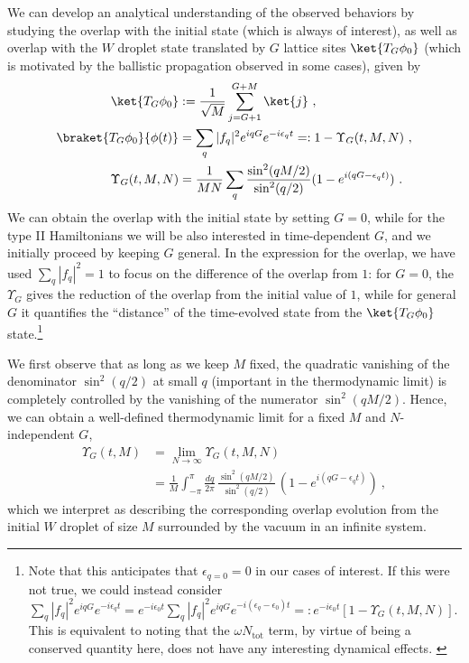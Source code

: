 \documentclass[prx,letterpaper,aps,superscriptaddress,floatfix,twocolumn,nofootinbib]{revtex4-2}
\theoremstyle{definition}
\newcommand{\defn}{:=}
\begin{document}
%
We can develop an analytical understanding of the observed behaviors by studying the overlap with the initial state (which is always of interest), as well as overlap with the $W$ droplet state translated by $G$ lattice sites $\ket{T_G \phi_0}$ (which is motivated by the ballistic propagation observed in some cases), given by
%
\begin{align}
\ket{T_G \phi_0} &\defn \frac{1}{\sqrt{M}} \sum_{j=G+1}^{G+M} \ket{j} ~, \nonumber\\
\braket{T_G \phi_0}{\phi(t)} &= \sum_q |f_q|^2 e^{i q G} e^{-i\epsilon_q t} =: 1 - \Upsilon_G(t,M,N) ~, \nonumber\\
\Upsilon_G(t,M,N) &= \frac{1}{M N} \sum_q \frac{\sin^2(qM/2)}{\sin^2(q/2)} (1 - e^{i (q G - \epsilon_q t)}) ~.
\label{eq:defUpsilon}
\end{align}
%
We can obtain the overlap with the initial state by setting $G = 0$, while for the type II Hamiltonians we will be also interested in time-dependent $G$, and we initially proceed by keeping $G$ general.
%
In the expression for the overlap, we have used $\sum_q |f_q|^2 = 1$ to focus on the difference of the overlap from $1$: for $G = 0$, the $\Upsilon_G$ gives the reduction of the overlap from the initial value of $1$, while for general $G$ it quantifies the ``distance'' of the time-evolved state from the $\ket{T_G\phi_0}$ state.\footnote{
Note that this anticipates that $\epsilon_{q=0} = 0$ in our cases of interest. If this were not true, we could instead consider $\sum_q |f_q|^2 e^{i q G} e^{-i\epsilon_q t} = e^{-i\epsilon_0 t} \sum_q |f_q|^2 e^{i q G} e^{-i (\epsilon_q - \epsilon_0) t} =: e^{-i\epsilon_0 t} [1 - \Upsilon_G(t,M,N)]$.
This is equivalent to noting that the $\omega N_{\text{tot}}$ term, by virtue of being a conserved quantity here, does not have any interesting dynamical effects.
\label{foot:epsq0}
}
%

%
We first observe that as long as we keep $M$ fixed, the quadratic vanishing of the denominator $\sin^2(q/2)$ at small $q$ (important in the thermodynamic limit) is completely controlled by the vanishing of the numerator $\sin^2(qM/2)$.
%
Hence, we can obtain a well-defined thermodynamic limit for a fixed $M$ and $N$-independent $G$,
\begin{equation}
\begin{aligned}
\Upsilon_G(t,M) &= \lim_{N \to \infty} \Upsilon_G(t,M,N) \\
&= \frac{1}{M} \int_{-\pi}^\pi \frac{dq}{2\pi} \,\frac{\sin^2(qM/2)}{\sin^2(q/2)} \, (1 - e^{i (q G-\epsilon_q t)}) ~,
\end{aligned}
\label{eq:Upsilon_tM}
\end{equation}
which we interpret as describing the corresponding overlap evolution from the initial $W$ droplet of size $M$ surrounded by the vacuum in an infinite system.
\end{document}
